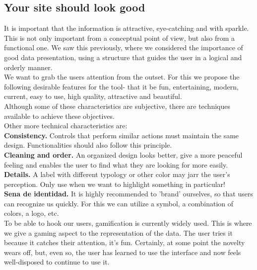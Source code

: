 \subsection{Your site should look good}

It is important that the information is attractive, eye-catching and with sparkle. This is not only important from a conceptual point of view, but also from a functional one. We saw this previously, where we considered the importance
of good data presentation, using a structure that guides the user in a logical and orderly manner.\\

We want to grab the users attention from the outset. For this we propose the following desirable features for the tool- that it be fun, entertaining,
modern, current, easy to use, high quality, attractive and beautiful.\\

Although some of these characteristics are subjective, there are techniques available to achieve these objectives.\\

Other more technical characteristics are: \\

\textbf{Consistency.} Controls that perform similar actions must maintain the same design. Functionalities
should also follow this principle. \\

\textbf{Cleaning and order.} An organized design looks better, give a more peaceful feeling and enables the user to find what they are looking for
more easily.\\

\textbf{Details.} A label with different typology or other color may jarr the user's perception. Only use when
we want to highlight something in particular! \\

\textbf{Sena de identidad.} It is highly recommended to 'brand' ourselves, so that users can recognize us quickly. For this we can utilize a symbol, a combination of colors, a logo, etc.\\

To be able to hook our users, gamification is currently widely used. This is where we give a gaming aspect to the representation of the data. The user tries it because it catches their attention, it's fun.
Certainly, at some point the novelty wears off, but, even so, the user has learned to use the interface and now feels well-disposed to continue to use it.

